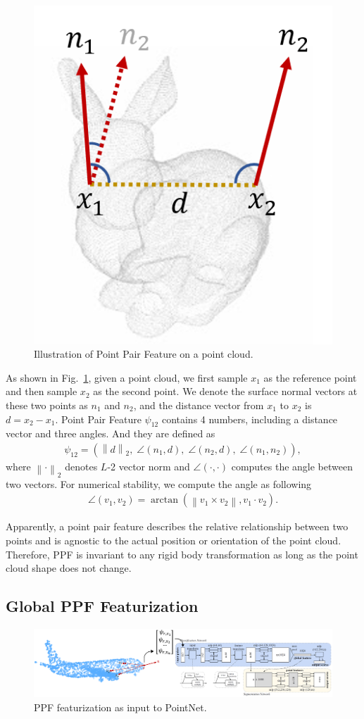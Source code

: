 \documentclass{article}
\newcommand{\norm}[1]{\left\lVert#1\right\rVert}
\begin{document}
\begin{figure}[t]
    \centering
    \includegraphics[width=0.25\linewidth]{images/ppf.png}
    \caption{Illustration of Point Pair Feature on a point cloud. }
    \label{fig:ppf_illu}
\end{figure}

As shown in Fig.~\ref{fig:ppf_illu}, given a point cloud, we first sample $x_1$ as the reference point and then sample $x_2$ as the second point. We denote the surface normal vectors at these two points as $n_1$ and $n_2$, and the distance vector from $x_1$ to $x_2$ is $d=x_2-x_1$. Point Pair Feature $\psi_{12}$ contains 4 numbers, including a distance vector and three angles. And they are defined as 
\begin{align}
    \psi_{12} = (\norm{d}_2, \; \angle (n_1, d), \; \angle(n_2, d), \; \angle (n_1, n_2)),
\end{align}
where $\norm{\cdot}_2$ denotes $L$-2 vector norm and $\angle(\cdot, \cdot)$ computes the angle between two vectors. For numerical stability, we compute the angle as following \cite{Birdal2015-ppfbased}
\begin{align}
    \angle(v_1, v_2) = \arctan(\norm{v_1 \times v_2}, v_1\cdot v_2).
\end{align}

Apparently, a point pair feature describes the relative relationship between two points and is agnostic to the actual position or orientation of the point cloud. Therefore, PPF is invariant to any rigid body transformation as long as the point cloud shape does not change.  


\subsection{Global PPF Featurization}
\label{section:PPF_inp}

\begin{figure}[hbt!]
\centering
    \includegraphics[width=.9\linewidth]{images/pn_input.png}
    \caption{PPF featurization as input to PointNet.}
\label{fig:pn_input}
\end{figure}
\end{document}
